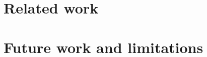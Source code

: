 \documentclass[sigconf]{acmart}
\begin{document}
\section{Related work}
\section{Future work and limitations}


  
  

\end{document}
